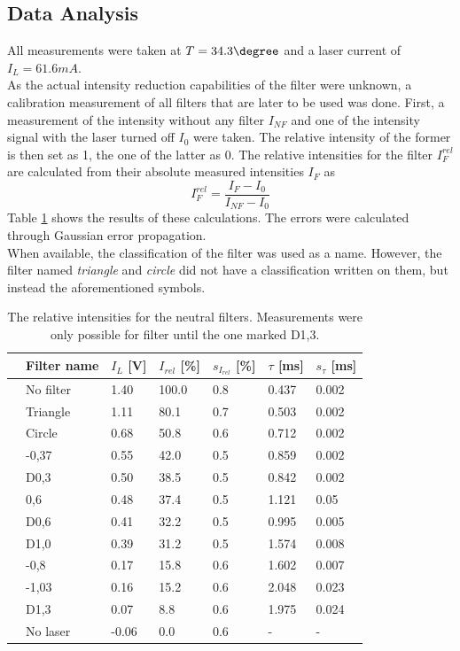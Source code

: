 \subsection{Data Analysis}
All measurements were taken at $T=\unit{34.3}{\degree}$ and a laser current of $I_L=\unit{61.6}{mA}$.\\
As the actual intensity reduction capabilities of the filter were unknown, a calibration measurement of all filters that are later to be used was done. First, a measurement of the intensity without any filter $I_{NF}$ and one of the intensity signal with the laser turned off $I_0$ were taken. The relative intensity of the former is then set as 1, the one of the latter as 0. The relative intensities for the filter $I^{rel}_F$ are calculated from their absolute measured intensities $I_F$ as
\begin{equation}
I^{rel}_F=\frac{I_F-I_0}{I_{NF}-I_0}
\end{equation}
Table \ref{tb:relintensities} shows the results of these calculations. The errors were calculated through Gaussian error propagation.\\ 
When available, the classification of the filter was used as a name. However, the filter named \emph{triangle} and \emph{circle} did not have a classification written on them, but instead the aforementioned symbols. 

\begin{table}\centering
	\begin{tabular}{@{}lllllll@{}}
		\toprule
		&Filter name&$I_L$ [V]&$I_{rel}$ [\%]&$s_{I_{rel}}$ [\%]&$\tau$ [ms]&$s_\tau$ [ms]\\ 
		\midrule
		&No filter&1.40&100.0&0.8&0.437&0.002\\
		&Triangle&1.11&80.1&0.7&0.503&0.002\\
		&Circle&0.68&50.8&0.6&0.712&0.002\\
		&-0,37&0.55&42.0&0.5&0.859&0.002\\
		&D0,3&0.50&38.5&0.5&0.842&0.002\\
		&0,6&0.48&37.4&0.5&1.121&0.05\\
		&D0,6&0.41&32.2&0.5&0.995&0.005\\
		&D1,0&0.39&31.2&0.5&1.574&0.008\\
		&-0,8&0.17&15.8&0.6&1.602&0.007\\
		&-1,03&0.16&15.2&0.6&2.048&0.023\\
		&D1,3&0.07&8.8&0.6&1.975&0.024\\
		&No laser&-0.06&0.0&0.6&-&-\\
		\bottomrule
	\end{tabular}
	\caption[Relative intensities of the filters]{The relative intensities for the neutral filters. Measurements were only possible for filter until the one marked D1,3.}
	\label{tb:relintensities}
\end{table}

